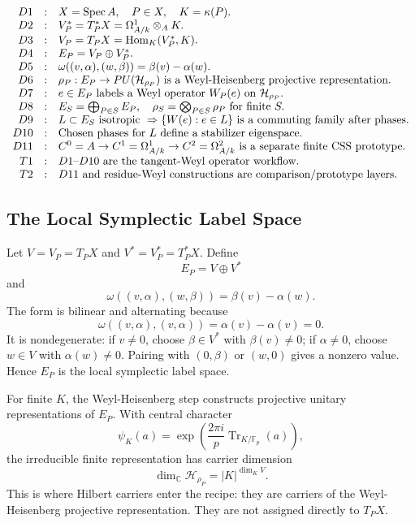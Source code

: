 \[
\begin{array}{rcl}
D1&:&X=\operatorname{Spec} A,\quad P\in X,\quad K=\kappa(P).\\
D2&:&V_P^*=T_P^*X=\Omega^1_{A/k}\otimes_AK.\\
D3&:&V_P=T_PX=\operatorname{Hom}_K(V_P^*,K).\\
D4&:&E_P=V_P\oplus V_P^*.\\
D5&:&\omega((v,\alpha),(w,\beta))=\beta(v)-\alpha(w).\\
D6&:&\rho_P:E_P\to PU(\mathcal H_{\rho_P})
      \text{ is a Weyl-Heisenberg projective representation}.\\
D7&:&e\in E_P\text{ labels a Weyl operator }W_P(e)\text{ on }
      \mathcal H_{\rho_P}.\\
D8&:&E_S=\bigoplus_{P\in S}E_P,\quad
      \rho_S=\bigotimes_{P\in S}\rho_P
      \text{ for finite }S.\\
D9&:&L\subset E_S\text{ isotropic } \Rightarrow
      \{W(e):e\in L\}\text{ is a commuting family after phases}.\\
D10&:&\text{Chosen phases for }L\text{ define a stabilizer eigenspace}.\\
D11&:&C^0=A\to C^1=\Omega^1_{A/k}\to C^2=\Omega^2_{A/k}
      \text{ is a separate finite CSS prototype}.\\
T1&:&D1\text{--}D10\text{ are the tangent-Weyl operator workflow}.\\
T2&:&D11\text{ and residue-Weyl constructions are comparison/prototype layers}.
\end{array}
\]

\subsection{The Local Symplectic Label Space}

Let \(V=V_P=T_PX\) and \(V^*=V_P^*=T_P^*X\).  Define
\[
  E_P=V\oplus V^*
\]
and
\[
  \omega((v,\alpha),(w,\beta))=\beta(v)-\alpha(w).
\]
The form is bilinear and alternating because
\[
  \omega((v,\alpha),(v,\alpha))=\alpha(v)-\alpha(v)=0.
\]
It is nondegenerate: if \(v\ne0\), choose \(\beta\in V^*\) with
\(\beta(v)\ne0\); if \(\alpha\ne0\), choose \(w\in V\) with
\(\alpha(w)\ne0\).  Pairing with \((0,\beta)\) or \((w,0)\) gives a nonzero
value.  Hence \(E_P\) is the local symplectic label space.

For finite \(K\), the Weyl-Heisenberg step constructs projective unitary
representations of \(E_P\).  With central character
\[
  \psi_K(a)=\exp\!\left(\frac{2\pi i}{p}
    \operatorname{Tr}_{K/\mathbb F_p}(a)\right),
\]
the irreducible finite representation has carrier dimension
\[
  \dim_{\mathbb C}\mathcal H_{\rho_P}=|K|^{\dim_K V}.
\]
This is where Hilbert carriers enter the recipe: they are carriers of the
Weyl-Heisenberg projective representation.  They are not assigned directly to
\(T_PX\).

